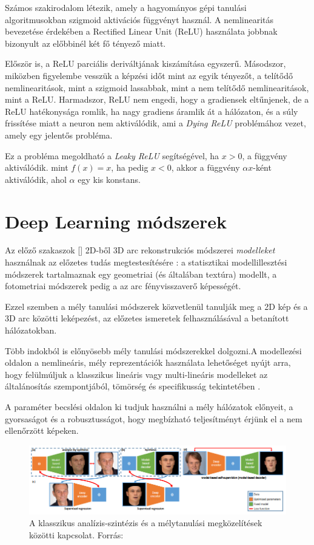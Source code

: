 \documentclass[12pt,a4]{article}
\begin{document}
	
	Számos szakirodalom létezik, amely a hagyományos gépi tanulási algoritmusokban
	szigmoid aktivációs függvényt használ.
	A nemlinearitás bevezetése érdekében a Rectified Linear Unit (ReLU) \cite{CNN} használata jobbnak bizonyult az előbbinél
	két fő tényező miatt. 
	
	Először is, a ReLU parciális deriváltjának kiszámítása egyszerű. 
	Másodszor, miközben figyelembe vesszük
	a képzési időt mint az egyik tényezőt, a telítődő nemlinearitások, mint a szigmoid lassabbak, mint a nem telítődő nemlinearitások, mint a ReLU.
	 Harmadszor, ReLU nem engedi, hogy a gradiensek eltűnjenek, de a ReLU hatékonysága romlik, ha nagy gradiens áramlik át a hálózaton, és a súly frissítése miatt a neuron nem aktiválódik, ami a \textit{Dying ReLU} problémához vezet, amely egy jelentős probléma. 
	 
	 Ez a probléma megoldható a \textit{Leaky ReLU} segítségével, ha $x>0$, a függvény aktiválódik.
	mint $f(x)= x$, ha pedig $x<0$, akkor a függvény $\alpha x$-ként aktiválódik, ahol $\alpha$ egy kis konstans.
	
	\section{Deep Learning módszerek}
	
	Az előző szakaszok [] 2D-ből 3D arc rekonstrukciós módszerei \textit{modelleket} használnak az előzetes tudás megtestesítésére \cite{survey}: a statisztikai modellillesztési módszerek tartalmaznak egy geometriai (és általában textúra) modellt, a fotometriai módszerek pedig a
	az arc fényvisszaverő képességét. 
	
	
	Ezzel szemben a mély tanulási módszerek
	közvetlenül tanulják meg a 2D kép és a 3D arc közötti leképezést, az előzetes ismeretek felhasználásával a betanított hálózatokban.
	
	
	Több indokból is előnyösebb mély tanulási módszerekkel dolgozni.\cite{3dmm}A modellezési oldalon a nemlineáris, mély reprezentációk használata lehetőséget nyújt arra, hogy felülmúljuk a klasszikus lineáris vagy multi-lineáris modelleket az általánosítás szempontjából, tömörség és specifikusság tekintetében \cite{styner}.
	
	
	A paraméter becslési oldalon ki tudjuk használni a mély hálózatok előnyeit, a gyorsaságot és a robusztusságot, hogy megbízható teljesítményt érjünk el a nem ellenőrzött képeken.
	
	\begin{figure}[h]	
		\centering
		\includegraphics[width=1\linewidth]{deep}
		\caption{A klasszikus analízis-szintézis és a mélytanulási megközelítések közötti kapcsolat. 
			Forrás:\cite{3dmm}}
	\end{figure}
	
\end{document}
